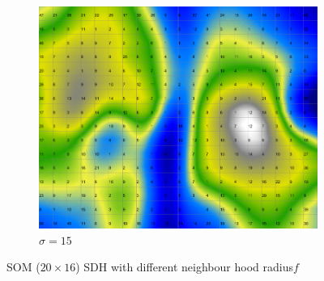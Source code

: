 \documentclass{acm_proc_article-sp}
\begin{document}
\begin{figure}
\begin{subfigure}[b]{0.30\linewidth}
    \end{subfigure}
    \begin{subfigure}[b]{0.30\linewidth}
        \includegraphics[width=\linewidth]{img/wine-newmid-smoothed-data-histogram-sigma-15}
        \caption{$\sigma=15$}
        \label{fig:wine-newmid-smoothed-data-histogram-sigma-15}
    \end{subfigure}
    \caption{SOM ($20\times16$) SDH with different neighbour hood radius$f$}
    \label{fig:wine-newmid-smoothed-data-histogram-sigma}
\end{figure}
\end{document}
